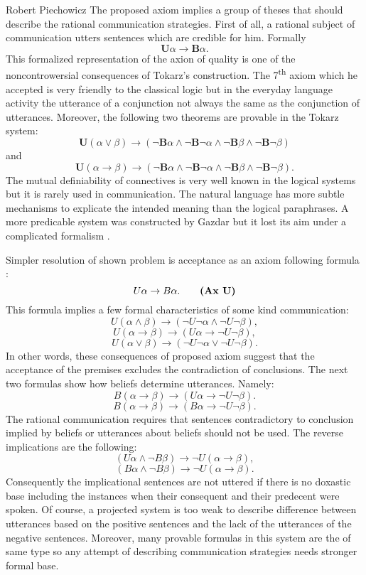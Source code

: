 \begin{artengenv}{Robert Piechowicz}
The proposed axiom implies a group of theses that should describe the rational communication strategies. First of all, a rational subject of communication utters sentences which are credible for him. Formally $$\textbf{U}\alpha\rightarrow \textbf{B}\alpha.$$ This formalized representation of the axion of quality is one of the noncontrowersial consequences of Tokarz’s construction.
The 7\textsuperscript{th} axiom which he accepted is very friendly to the classical logic but in the everyday language activity the utterance of a conjunction not always the same as the conjunction of utterances. Moreover, the following two theorems are provable in the Tokarz system:
$$\mathbf{U}(\alpha\vee \beta)\rightarrow (\neg\mathbf{B}\alpha\wedge\neg\mathbf{B}\neg \alpha\wedge \neg\mathbf{B}\beta\wedge \neg \mathbf{B}\neg\beta)$$
and
$$\mathbf{U}(\alpha\rightarrow \beta)\rightarrow (\neg\mathbf{B}\alpha\wedge\neg\mathbf{B}\neg \alpha\wedge \neg\mathbf{B}\beta\wedge\neg \mathbf{B}\neg\beta).$$
The mutual definiability of connectives is very well known in the logical systems but it is rarely used in communication. The natural language has more subtle mechanisms to explicate the intended meaning than the logical paraphrases. A more predicable system was constructed by Gazdar but it lost its aim under a complicated formalism
\parencite[see][]{gazdar_pragmatics_1979}.

 Simpler resolution of shown problem is acceptance as an axiom following formula
 \parencite[see][p.143]{piechowicz_jezyk_2015}:
\begin{equation}
U\alpha\rightarrow B\alpha.\tag*{\textbf{(Ax U)}}
\end{equation}
This formula implies a few formal characteristics of some kind communication:
$$U(\alpha\wedge \beta)\rightarrow (\neg U\neg \alpha\wedge \neg U\neg \beta),$$
$$U(\alpha\rightarrow \beta)\rightarrow (U\alpha\rightarrow \neg U\neg \beta),$$
$$U(\alpha\vee \beta)\rightarrow (\neg U\neg \alpha\vee \neg U\neg \beta).$$
In other words, these consequences of proposed axiom suggest that the acceptance of the premises excludes the contradiction of conclusions.
The next two formulas show how beliefs determine utterances. Namely:
$$B(\alpha\rightarrow \beta)\rightarrow (U\alpha\rightarrow \neg U\neg\beta).$$
$$B(\alpha\rightarrow \beta)\rightarrow (B\alpha\rightarrow \neg U\neg \beta).$$
The rational communication requires that sentences contradictory to conclusion implied by beliefs or utterances about beliefs should not be used. The reverse implications are the following:
$$(U\alpha\wedge \neg B\beta)\rightarrow \neg U(\alpha\rightarrow \beta), $$
$$(B\alpha\wedge \neg B\beta)\rightarrow \neg U(\alpha\rightarrow \beta). $$
Consequently the implicational sentences are not uttered if there is no doxastic base including the instances when their consequent and their predecent were spoken.  Of course, a projected system is too weak to describe difference between utterances based on the positive sentences and the lack of the utterances of the negative sentences. Moreover, many provable formulas in this system are the of same type so any attempt of describing communication strategies needs stronger formal base.


\end{artengenv}
